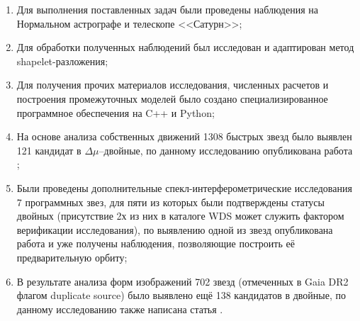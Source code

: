 \begin{enumerate}
 \item Для выполнения поставленных задач были проведены наблюдения на Нормальном астрографе и телескопе <<Сатурн>>;
 \item Для обработки полученных наблюдений был исследован и адаптирован метод shapelet-разложения;
   \item Для получения прочих материалов исследования, численных расчетов и построения промежуточных моделей было создано специализированное программное обеспечения на C++ и Python;
 \item На основе анализа собственных движений 1308 быстрых звезд было выявлен 121 кандидат в $\Delta\mu$--двойные, по данному исследованию опубликована работа \cite{2015AstL...41..833K};
 \item Были проведены дополнительные спекл-интерферометрические исследования 7 программных звез, для пяти из которых были подтверждены статусы двойных (присутствие 2х из них в каталоге WDS может служить фактором верификации исследования), по выявлению одной из звезд опубликована работа \cite{2016AstL...42..686K} и уже получены наблюдения, позволяющие построить её предварительную орбиту;
   \item В результате анализа форм изображений 702 звезд (отмеченных в Gaia DR2 флагом \glqq duplicate source\grqq ) было выявлено ещё 138 кандидатов в двойные, по данному исследованию также написана статья \cite{2018AstL...44..103K}.
\end{enumerate}
